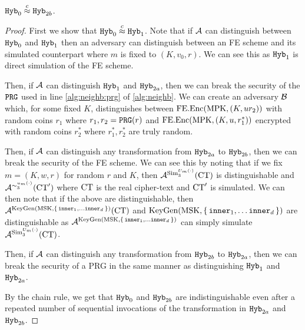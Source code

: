 \begin{lemma}
	\label{lem:hybrOneToFour}
	$\texttt{Hyb}_0 \overset{c}{\approx} \texttt{Hyb}_{2b}$.	
	\begin{proof}
		First we show that $\texttt{Hyb}_0 \overset{c}{\approx} \texttt{Hyb}_1$. Note that if $\mathcal{A}$ can distinguish
		between $\texttt{Hyb}_0$ and $\texttt{Hyb}_1$ then an adversary can distinguish between an FE scheme and its simulated counterpart
		where $m$ is fixed to $(K, v_0, r)$. We can see this as $\texttt{Hyb}_1$ is  direct simulation of the FE scheme.

		Then, if $\mathcal{A}$ can distinguish $\texttt{Hyb}_1$ and $\texttt{Hyb}_{2a}$, then we can break the security of the $\texttt{PRG}$ used in line \ref{alg:neighb:prg} of \cref{alg:neighb}.
		We can create an adversary $\mathcal{B}$ which, for some fixed $K$, distinguishes between $\text{FE.Enc}(\text{MPK}, (K, u r_2))$ with random coins $r_1$ where $r_1, r_2 = \texttt{PRG}(r)$
		and $\text{FE.Enc}(\text{MPK}, (K, u, r_1^*))$ encrypted with random coins $r_2^*$ where $r_1^*, r_2^*$ are truly random.

		Then, if $\mathcal{A}$ can distinguish any transformation from $\texttt{Hyb}_{2a}$ to $\texttt{Hyb}_{2b}$, then we can break the security of the FE scheme.
		We can see this by noting that if we fix $m = (K, w, r)$ for random $r$ and $K$,
		then $\mathcal{A}^{\text{Sim}_3^{U_m(\cdot)}}(\text{CT})$ is distinguishable
		and $\mathcal{A}^{\sim_3^{u_m(\cdot)}}(\text{CT}')$ where $\text{CT}$ is the real cipher-text and $\text{CT}'$ is simulated.
		We can then note that if the above are distinguishable, then
		$\mathcal{A}^{\text{KeyGen}(\text{MSK}, \set{\texttt{inner}_1, \dots \texttt{inner}_d})}(\text{CT})$ 
		and $\text{KeyGen}(\text{MSK}, \set{\texttt{inner}_1, \dots \texttt{inner}_d})$ are distinguishable
		as $\mathcal{A}^{\text{KeyGen}(\text{MSK}, \set{\texttt{inner}_1, \dots \texttt{inner}_d})}$ can simply simulate
		$\mathcal{A}^{\text{Sim}_3^{U_m(\cdot)}}(\text{CT})$.

		Then, if $\mathcal{A}$ can distinguish any transformation from $\texttt{Hyb}_{2b}$ to $\texttt{Hyb}_{2a}$, then we can break the security of a PRG
		in the same manner as distinguishing $\texttt{Hyb}_1$ and $\texttt{Hyb}_{2a}$.

		By the chain rule, we get that $\texttt{Hyb}_0$ and $\texttt{Hyb}_{2b}$ are indistinguishable even after a repeated
		number of sequential invocations of the transformation in $\texttt{Hyb}_{2a}$ and $\texttt{Hyb}_{2b}$.
	\end{proof}
\end{lemma}


